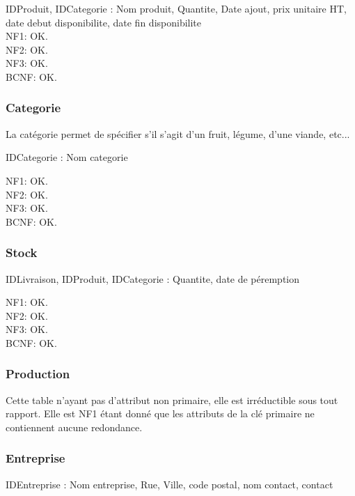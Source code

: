 \documentclass[a4paper, 12pt]{report}
\begin{document}
\begin{spacing}{1.2}
IDProduit, IDCategorie : Nom produit, Quantite, Date ajout, prix unitaire HT, date debut disponibilite, date fin disponibilite \\


NF1: OK.\\
NF2: OK.\\
NF3: OK.\\
BCNF: OK.\\

\textcolor{colortitre3}{\subsubsection*{\hypertarget{Categorie}{Categorie}}}

La catégorie permet de spécifier s'il s'agit d'un fruit, légume, d'une viande, etc...

IDCategorie : Nom categorie

NF1: OK.\\
NF2: OK.\\
NF3: OK.\\
BCNF: OK.\\

\textcolor{colortitre3}{\subsubsection*{\hypertarget{Stock}{Stock}}}

IDLivraison, IDProduit, IDCategorie : Quantite, date de péremption

NF1: OK.\\
NF2: OK.\\
NF3: OK.\\
BCNF: OK.\\

\textcolor{colortitre3}{\subsubsection*{\hypertarget{Production}{Production}}}

Cette table n'ayant pas d'attribut non primaire, elle est irréductible sous tout rapport. Elle est NF1 étant donné que les attributs de la clé primaire ne contiennent aucune redondance.

\textcolor{colortitre3}{\subsubsection*{\hypertarget{Entreprise}{Entreprise}}}

IDEntreprise : Nom entreprise, Rue, Ville, code postal, nom contact, contact


\end{spacing}
\end{document}

